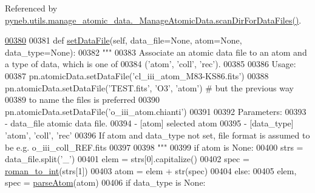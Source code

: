 Referenced by \hyperlink{manage__atomic__data_8py_source_l00358}{pyneb.\-utils.\-manage\-\_\-atomic\-\_\-data.\-\_\-\-Manage\-Atomic\-Data.\-scan\-Dir\-For\-Data\-Files()}.


\begin{DoxyCode}
\hypertarget{classpyneb_1_1utils_1_1manage__atomic__data_1_1___manage_atomic_data_l00380}{}\hyperlink{classpyneb_1_1utils_1_1manage__atomic__data_1_1___manage_atomic_data_a76ee45cb9b8a5ead8cd716ebc0facf92}{00380} 
00381     \textcolor{keyword}{def }\hyperlink{classpyneb_1_1utils_1_1manage__atomic__data_1_1___manage_atomic_data_a76ee45cb9b8a5ead8cd716ebc0facf92}{setDataFile}(self, data\_file=None, atom=None, data\_type=None):
00382         \textcolor{stringliteral}{"""}
00383 \textcolor{stringliteral}{        Associate an atomic data file to an atom and a type of data, which is one of }
00384 \textcolor{stringliteral}{            ('atom', 'coll', 'rec').}
00385 \textcolor{stringliteral}{}
00386 \textcolor{stringliteral}{        Usage:}
00387 \textcolor{stringliteral}{            pn.atomicData.setDataFile('cl\_iii\_atom\_M83-KS86.fits')}
00388 \textcolor{stringliteral}{            pn.atomicData.setDataFile('TEST.fits', 'O3', 'atom') # but the previous way }
00389 \textcolor{stringliteral}{                to name the files is preferred}
00390 \textcolor{stringliteral}{            pn.atomicData.setDataFile('o\_iii\_atom.chianti')}
00391 \textcolor{stringliteral}{}
00392 \textcolor{stringliteral}{        Parameters:}
00393 \textcolor{stringliteral}{            - data\_file    atomic data file. }
00394 \textcolor{stringliteral}{            - [atom]         selected atom}
00395 \textcolor{stringliteral}{            - [data\_type]    'atom', 'coll', 'rec'}
00396 \textcolor{stringliteral}{            If atom and data\_type not set, file format is assumed to be e.g. o\_iii\_coll\_REF.fits}
00397 \textcolor{stringliteral}{}
00398 \textcolor{stringliteral}{        """}          
00399         \textcolor{keywordflow}{if} atom \textcolor{keywordflow}{is} \textcolor{keywordtype}{None}:
00400             strs = data\_file.split(\textcolor{stringliteral}{'\_'})
00401             elem = strs[0].capitalize()
00402             spec = \hyperlink{namespacepyneb_1_1utils_1_1misc_ae67dbd6bb48d64216bc162ebdc25a183}{roman\_to\_int}(strs[1])
00403             atom = elem + str(spec)
00404         \textcolor{keywordflow}{else}:
00405             elem, spec = \hyperlink{namespacepyneb_1_1utils_1_1misc_a2bb6f906a75f26a882093e9ce9272507}{parseAtom}(atom)
00406         \textcolor{keywordflow}{if} data\_type \textcolor{keywordflow}{is} \textcolor{keywordtype}{None}:

\end{DoxyCode}
